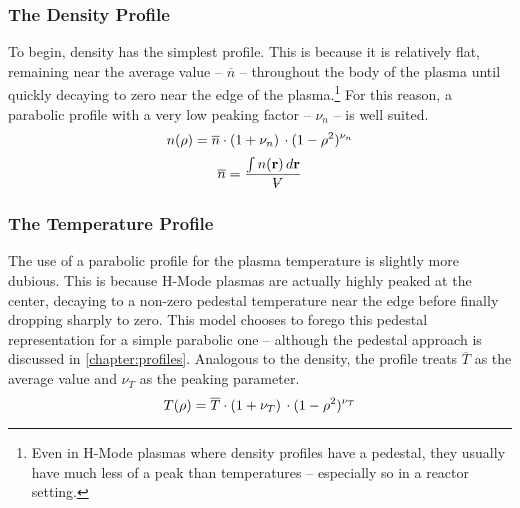 \subsubsection{The Density Profile}

To begin, density has the simplest profile. This is because it is relatively flat, remaining near the average value -- $\overline n$ -- throughout the body of the plasma until quickly decaying to zero near the edge of the plasma.\footnote{Even in H-Mode plasmas where density profiles have a pedestal,\cite{density} they usually have much less of a peak than temperatures\cite{temperature} -- especially so in a reactor setting.\cite{pedestals}} For this reason, a parabolic profile with a very low peaking factor -- $\nu_n$ -- is well suited.
\begin{equation}
	n(\rho) = \overline n \cdot ( 1 + \nu_n ) \, \cdot ( 1 - \rho ^ 2 ) ^ {\nu_n}
	\myequations{Density Profile -- $n$}
\end{equation}
\begin{equation}
	\overline n = \frac{ \int n(\vec{\bold{r}}) \, d\vec{\bold{r}}  }{\volume}
\end{equation}

\subsubsection{The Temperature Profile}

The use of a parabolic profile for the plasma temperature is slightly more dubious. This is because H-Mode plasmas are actually highly peaked at the center, decaying to a non-zero pedestal temperature near the edge before finally dropping sharply to zero. This model chooses to forego this pedestal representation for a simple parabolic one -- although the pedestal approach is discussed in \cref{chapter:profiles}. Analogous to the density, the profile treats $\overline T$ as the average value and $\nu_T$ as the peaking parameter.
\begin{equation}
	T(\rho) = \overline T \cdot ( 1 + \nu_T ) \, \cdot ( 1 - \rho ^ 2 ) ^ {\nu_T}
	\myequations{Temperature Profile -- $T$}
\end{equation}

